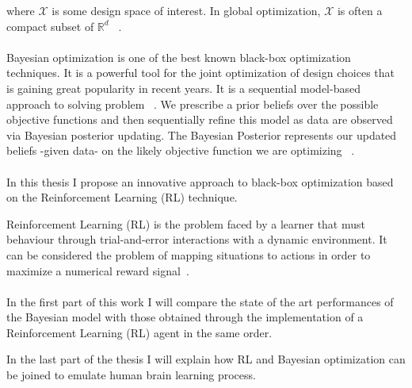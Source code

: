 where $\mathcal{X}$ is some design space of interest. In global optimization, $\mathcal{X}$ is often a compact subset of $\mathbb{R}^d$ ~\cite{DBLP:journals/pieee/ShahriariSWAF16}.

\paragraph{} Bayesian optimization is one of the best known black-box optimization techniques. It is a powerful tool for the joint optimization of design choices that is gaining great popularity in recent years. It is a sequential model-based approach to solving problem ~\cite{Adams2008GaussianPP}. We prescribe a prior beliefs over the possible objective functions and then sequentially refine this model as data are observed via Bayesian posterior updating. The Bayesian Posterior represents our updated beliefs -given data- on the likely objective function we are optimizing ~\cite{DBLP:journals/pieee/ShahriariSWAF16}.

\paragraph {} In this thesis I propose an innovative approach to black-box optimization based on the Reinforcement Learning (RL) technique.

Reinforcement Learning (RL) is the problem faced by a learner that must behaviour through trial-and-error interactions with a dynamic environment. It can be considered the problem of mapping situations to actions in order to maximize a numerical reward signal~\cite{RLDef1}.

\paragraph{} In the first part of this work I will compare the state of the art performances of the Bayesian model with those obtained through the implementation of a Reinforcement Learning (RL) agent in the same order. 

In the last part of the thesis I will explain how RL and Bayesian optimization can be joined to emulate human brain learning process.


